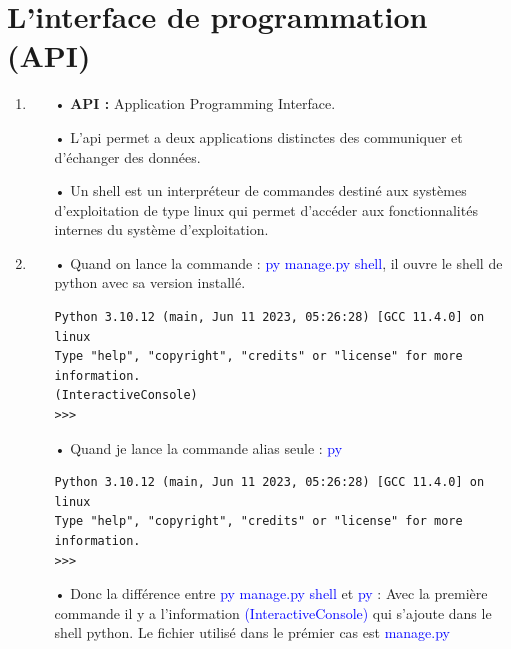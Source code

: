 \documentclass[10pt,a4paper]{article}
\begin{document}
\section{L'interface de programmation (API)}
\begin{enumerate}
\item 
\begin{itemize}
\item[]
\item[•] \textbf{API :}  Application Programming Interface.
\item[•] L'api permet a deux applications distinctes des communiquer et d'échanger des données.
\item[•] Un shell est un interpréteur de commandes destiné aux systèmes d'exploitation de type linux qui permet d'accéder aux fonctionnalités internes du système d'exploitation.
\end{itemize}


\item 
\begin{itemize}
\item[]
\item[•] Quand on lance la commande : \textcolor{blue}{py manage.py shell}, il ouvre le shell de python avec sa version installé. \\
\begin{verbatim}
Python 3.10.12 (main, Jun 11 2023, 05:26:28) [GCC 11.4.0] on linux
Type "help", "copyright", "credits" or "license" for more information.
(InteractiveConsole)
>>> 
\end{verbatim}

\item[•] Quand je lance la commande alias seule : \textcolor{blue}{py}\\
\begin{verbatim}
Python 3.10.12 (main, Jun 11 2023, 05:26:28) [GCC 11.4.0] on linux
Type "help", "copyright", "credits" or "license" for more information.
>>> 
\end{verbatim}

\item[•] Donc la différence entre \textcolor{blue}{py manage.py shell} et \textcolor{blue}{py} : Avec la première commande il y a l'information \textcolor{blue}{(InteractiveConsole)} qui s'ajoute dans le shell python. Le fichier utilisé dans le prémier cas est \textcolor{blue}{manage.py}
\end{itemize}




\end{enumerate}
\end{document}

